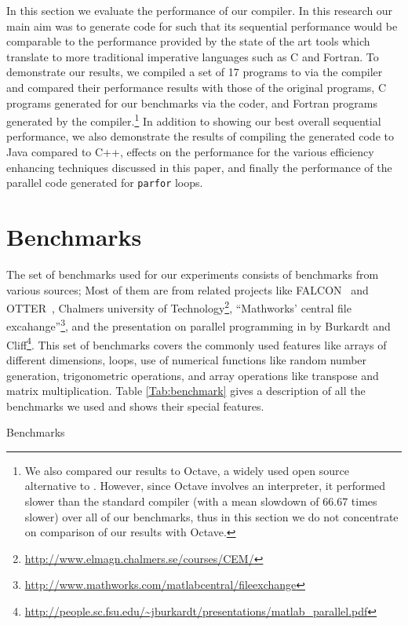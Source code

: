 In this section we evaluate the performance of our compiler. In this research
our main aim was to generate \xten code for \matlab such that its sequential
performance would be comparable to the performance provided by the state of the
art tools which translate \matlab to more traditional imperative languages such
as C and Fortran.  To demonstrate our results, we compiled a set of 17 \matlab
programs to \xten via the \mixten compiler and compared their performance
results with those of the original \matlab programs, C programs generated for
our benchmarks via the \matlab coder, and Fortran programs generated by the
\mctwofor compiler.\footnote{We also compared our results to Octave, a widely
used open source alternative to \matlab. However, since Octave involves an
interpreter, it performed slower than the standard \matlab compiler (with a
mean slowdown of 66.67 times slower) over all of our benchmarks, thus in this
section we do not concentrate on comparison of our results with Octave.} In
addition to showing our best overall sequential performance,  we also
demonstrate the results of compiling the generated \xten code to Java compared
to C++, effects on the performance for the various efficiency enhancing
techniques discussed in this paper, and finally the performance of the parallel
\xten code generated for \matlab \texttt{parfor} loops.

\section{Benchmarks}

The set of benchmarks used for our experiments consists of benchmarks from
various sources; Most of them are from related projects like
FALCON~\cite{falcon} and OTTER~\cite{QMSZ98}, Chalmers university of
Technology\footnote{\url{http://www.elmagn.chalmers.se/courses/CEM/}}, ``Mathworks'
central file
excahange''\footnote{\url{http://www.mathworks.com/matlabcentral/fileexchange}}, and
the presentation on parallel programming in \matlab by Burkardt and
Cliff\footnote{\url{http://people.sc.fsu.edu/~jburkardt/presentations/matlab\_parallel.pdf}}.
This set of benchmarks covers the commonly used \matlab features like arrays of
different dimensions, loops, use of numerical functions like random number
generation, trigonometric operations, and array operations like transpose and
matrix multiplication. Table \ref{Tab:benchmark} gives a description of all the
benchmarks we used and shows their special features.  

\begin{table}
\centering
\scalebox{0.77}{
 
}
\caption{Benchmarks} 
\label{Tab:benchmark}
\end{table}

